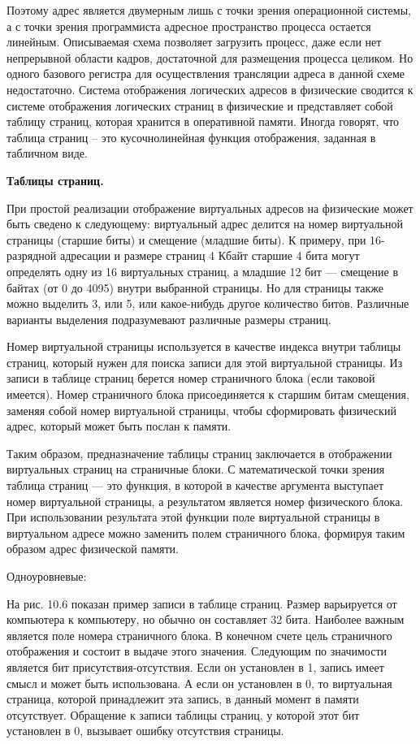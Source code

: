 Поэтому адрес является двумерным лишь с точки зрения операционной системы, а с точки зрения программиста адресное пространство процесса остается линейным. Описываемая схема позволяет загрузить процесс, даже если нет непрерывной области кадров, достаточной для размещения процесса целиком. Но одного базового регистра для осуществления трансляции адреса в данной схеме недостаточно. Система отображения логических адресов в физические сводится к системе отображения логических страниц в физические и представляет собой таблицу страниц, которая хранится в оперативной памяти. Иногда говорят, что таблица страниц – это кусочнолинейная функция отображения, заданная в табличном виде.

\begin{center}{\bfseries Таблицы страниц.}
\end{center}

При простой реализации отображение виртуальных адресов на физические может быть сведено к следующему: виртуальный адрес делится на номер виртуальной страницы (старшие биты) и смещение (младшие биты). К примеру, при 16-разрядной адресации и размере страниц 4 Кбайт старшие 4 бита могут определять одну из 16 виртуальных страниц, а младшие 12 бит — смещение в байтах (от 0 до 4095) внутри выбранной страницы. Но для страницы также можно выделить 3, или 5, или какое-нибудь другое количество битов. Различные варианты выделения подразумевают различные размеры страниц.

Номер виртуальной страницы используется в качестве индекса внутри таблицы страниц, который нужен для поиска записи для этой виртуальной страницы. Из записи в таблице страниц берется номер страничного блока (если таковой имеется). Номер страничного блока присоединяется к старшим битам смещения, заменяя собой номер виртуальной страницы, чтобы сформировать физический адрес, который может быть послан к памяти.

Таким образом, предназначение таблицы страниц заключается в отображении виртуальных страниц на страничные блоки. С математической точки зрения таблица страниц — это функция, в которой в качестве аргумента выступает номер виртуальной страницы, а результатом является номер физического блока. При использовании результата этой функции поле виртуальной страницы в виртуальном адресе можно заменить полем страничного блока, формируя таким образом адрес физической памяти.

Одноуровневые:

На рис. 10.6 показан пример записи в таблице страниц. Размер варьируется от компьютера к компьютеру, но обычно он составляет 32 бита. Наиболее важным является поле номера страничного блока. В конечном счете цель страничного отображения и состоит в выдаче этого значения. Следующим по значимости является бит присутствия-отсутствия. Если он установлен в 1, запись имеет смысл и может быть использована. А если он установлен в 0, то виртуальная страница, которой принадлежит эта запись, в данный момент в памяти отсутствует. Обращение к записи таблицы страниц, у которой этот бит установлен в 0, вызывает ошибку отсутствия страницы.


